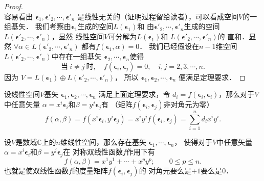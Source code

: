 \begin{proof}
\begin{equation*}
    \end{equation*}
    容易看出
    $\boldsymbol{\epsilon}_1,\boldsymbol{\epsilon}'_2,\cdots,\boldsymbol{\epsilon}'_n$
    是线性无关的（证明过程留给读者），可以看成空间$V$的一组基矢．
    我们考察由$\boldsymbol{\epsilon}_1$生成的空间$L(\boldsymbol{\epsilon}_1)$和
    由$\boldsymbol{\epsilon}'_2,\cdots,\boldsymbol{\epsilon}'_n$生成的空间
    $L(\boldsymbol{\epsilon}'_2,\cdots,\boldsymbol{\epsilon}'_n)$，显然
    线性空间$V$可分解为$L(\boldsymbol{\epsilon}_1)$和
    $L(\boldsymbol{\epsilon}'_2,\cdots,\boldsymbol{\epsilon}'_n)$的
    {\kaishu 直和}．显然
    $\forall \alpha \in L(\boldsymbol{\epsilon}'_2,\cdots,\boldsymbol{\epsilon}'_n)$
    都有$f(\boldsymbol{\epsilon}_1,\alpha)=0$．
    我们已经假设在$n-1$维空间
    $L(\boldsymbol{\epsilon}'_2,\cdots,\boldsymbol{\epsilon}'_n)$中存在一组基矢
    $\boldsymbol{\epsilon}_2,\cdots,\boldsymbol{\epsilon}_n$使得
    \begin{equation*}
        \text{当} \ i \neq j \ \text{时}, \quad
        f(\boldsymbol{\epsilon}_i,\boldsymbol{\epsilon}_j) = 0,
        \quad i,j=2,3,\cdots, n.
    \end{equation*}
    因为
    $V=L(\boldsymbol{\epsilon}_1) \oplus
    L(\boldsymbol{\epsilon}'_2,\cdots,\boldsymbol{\epsilon}'_n)$，
    所以
    $\boldsymbol{\epsilon}_1,\boldsymbol{\epsilon}_2,\cdots,\boldsymbol{\epsilon}_n$
    便满足定理要求．
\end{proof}


设线性空间$V$基矢
$\boldsymbol{\epsilon}_1,\boldsymbol{\epsilon}_2,\cdots,\boldsymbol{\epsilon}_n$
满足上面定理要求，令
$d_i = f(\boldsymbol{\epsilon}_i,\boldsymbol{\epsilon}_i)$，那么对于$V$中任意矢量
$\alpha = x^i \boldsymbol{\epsilon}_i$和$\beta = y^j \boldsymbol{\epsilon}_j$有
（矩阵$f(\boldsymbol{\epsilon}_i,\boldsymbol{\epsilon}_j)$非对角元为零）
\begin{equation}\label{chmla:eqn_tmp10}
    f(\alpha,\beta)=f(x^i \boldsymbol{\epsilon}_i,y^j \boldsymbol{\epsilon}_j)
    =x^i y^j f( \boldsymbol{\epsilon}_i, \boldsymbol{\epsilon}_j)
    =\sum_{i=1}^{n} d_i x^i y^i .
\end{equation}

\begin{corollary}\label{chmla:thm_pm1num-comp}
    设$V$是数域$\mathbb{C}$上的$n$维线性空间，那么存在基矢
    $\boldsymbol{\epsilon}_1,\cdots,\boldsymbol{\epsilon}_n$，
    使得对于$V$中任意矢量
    $\alpha = x^i \boldsymbol{\epsilon}_i$和$\beta = y^j \boldsymbol{\epsilon}_j$在
    对称双线性函数$f$作用下有
    \begin{equation}\label{chmla:eqn_gmetric-comp}
        f(\alpha,\beta)= x^1 y^1 + \cdots + x^p y^p;\qquad
        0 \leqslant p \leqslant n.
    \end{equation}
    也就是使双线性函数$f$的度量矩阵$f(\boldsymbol{\epsilon}_i,\boldsymbol{\epsilon}_j)$的
    对角元要么是$+1$要么是$0$．
\end{corollary}


